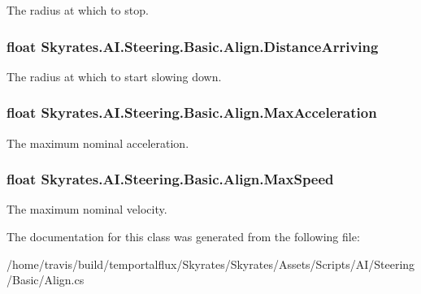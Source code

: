 The radius at which to stop. 

\hypertarget{class_skyrates_1_1_a_i_1_1_steering_1_1_basic_1_1_align_a6a9abaf9ec2bfd07b94ed22cb2b76be3}{
\subsubsection[{Distance\-Arriving}]{\setlength{\rightskip}{0pt plus 5cm}float Skyrates.\-A\-I.\-Steering.\-Basic.\-Align.\-Distance\-Arriving}}\label{class_skyrates_1_1_a_i_1_1_steering_1_1_basic_1_1_align_a6a9abaf9ec2bfd07b94ed22cb2b76be3}


The radius at which to start slowing down. 

\hypertarget{class_skyrates_1_1_a_i_1_1_steering_1_1_basic_1_1_align_aff428814e7bf994867c87529038646e3}{
\subsubsection[{Max\-Acceleration}]{\setlength{\rightskip}{0pt plus 5cm}float Skyrates.\-A\-I.\-Steering.\-Basic.\-Align.\-Max\-Acceleration}}\label{class_skyrates_1_1_a_i_1_1_steering_1_1_basic_1_1_align_aff428814e7bf994867c87529038646e3}


The maximum nominal acceleration. 

\hypertarget{class_skyrates_1_1_a_i_1_1_steering_1_1_basic_1_1_align_ab4911f80787556c63910b546e9483215}{
\subsubsection[{Max\-Speed}]{\setlength{\rightskip}{0pt plus 5cm}float Skyrates.\-A\-I.\-Steering.\-Basic.\-Align.\-Max\-Speed}}\label{class_skyrates_1_1_a_i_1_1_steering_1_1_basic_1_1_align_ab4911f80787556c63910b546e9483215}


The maximum nominal velocity. 



The documentation for this class was generated from the following file\-:\begin{DoxyCompactItemize}
\item 
/home/travis/build/temportalflux/\-Skyrates/\-Skyrates/\-Assets/\-Scripts/\-A\-I/\-Steering/\-Basic/Align.\-cs\end{DoxyCompactItemize}
